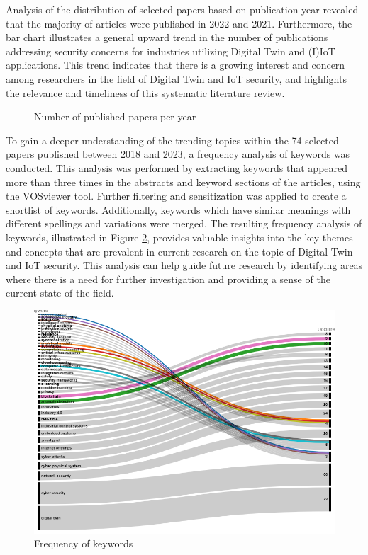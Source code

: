 Analysis of the distribution of selected papers based on publication year revealed that the majority of articles were published in 2022 and 2021. Furthermore, the bar chart illustrates a general upward trend in the number of publications addressing security concerns for industries utilizing Digital Twin and (I)IoT applications. This trend indicates that there is a growing interest and concern among researchers in the field of Digital Twin and IoT security, and highlights the relevance and timeliness of this systematic literature review.

\begin{figure}[H]
    
    \caption{Number of published papers per year}
    \label{fig:bar-chart-yaer}
\end{figure}
To gain a deeper understanding of the trending topics within the 74 selected papers published between 2018 and 2023, a frequency analysis of keywords was conducted. This analysis was performed by extracting keywords that appeared more than three times in the abstracts and keyword sections of the articles, using the VOSviewer tool. Further filtering and sensitization was applied to create a shortlist of keywords. Additionally, keywords which have similar meanings with different spellings and variations were merged. The resulting frequency analysis of keywords, illustrated in Figure \ref{fig:alluvial-key}, provides valuable insights into the key themes and concepts that are prevalent in current research on the topic of Digital Twin and IoT security. This analysis can help guide future research by identifying areas where there is a need for further investigation and providing a sense of the current state of the field.


\begin{figure}[H]
    \includegraphics[width=\textwidth]{images/key_belt.png}
    \caption{Frequency of keywords}
    \label{fig:alluvial-key}
\end{figure}

